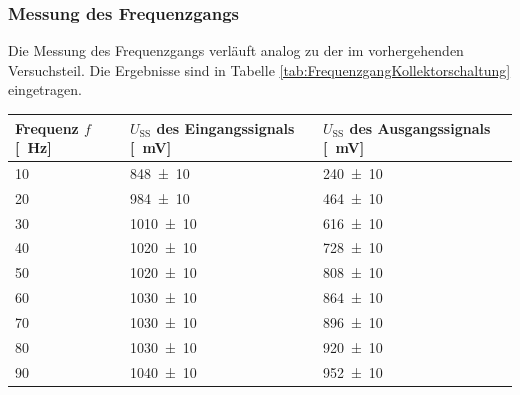 \subsubsection*{Messung des Frequenzgangs}
%
Die Messung des Frequenzgangs verläuft analog zu der im vorhergehenden Versuchsteil.
Die Ergebnisse sind in Tabelle \ref{tab:FrequenzgangKollektorschaltung} eingetragen.
%
\par
%
\minipage{\linewidth}
    \begin{center}
        \captionsetup{type=table}
        \begin{adjustbox}{max width=\linewidth, keepaspectratio}
            \begin{tabular}{lll}
            \toprule
            Frequenz $f$ [\SI{}{\hertz}] & $U_{\text{SS}}$ des Eingangssignals [\SI{}{\milli\volt}] & $U_{\text{SS}}$ des Ausgangssignals [\SI{}{\milli\volt}] \\
            \midrule
            \SI{10}{}                    & \SI{848 \pm 10}{}                                        & \SI{240 \pm 10}{}                                        \\
            \SI{20}{}                    & \SI{984 \pm 10}{}                                        & \SI{464 \pm 10}{}                                        \\
            \SI{30}{}                    & \SI{1010 \pm 10}{}                                       & \SI{616 \pm 10}{}                                        \\
            \SI{40}{}                    & \SI{1020 \pm 10}{}                                       & \SI{728 \pm 10}{}                                        \\
            \SI{50}{}                    & \SI{1020 \pm 10}{}                                       & \SI{808 \pm 10}{}                                        \\
            \SI{60}{}                    & \SI{1030 \pm 10}{}                                       & \SI{864 \pm 10}{}                                        \\
            \SI{70}{}                    & \SI{1030 \pm 10}{}                                       & \SI{896 \pm 10}{}                                        \\
            \SI{80}{}                    & \SI{1030 \pm 10}{}                                       & \SI{920 \pm 10}{}                                        \\
            \SI{90}{}                    & \SI{1040 \pm 10}{}                                       & \SI{952 \pm 10}{}                                        \\

\end{tabular}
\end{adjustbox}
\end{center}
